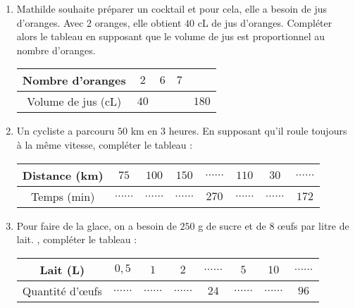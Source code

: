 \begin{pageAD} 




 \begin{enumerate}
 \item Mathilde souhaite préparer un cocktail et pour cela, elle a besoin de jus d'oranges.
 Avec 2 oranges, elle obtient $40$ cL de jus d'oranges. Compléter alors le tableau en supposant que le volume de jus est proportionnel au nombre d'oranges.
 \begin{center}
     \begin{tabular}{|c|c|c|c|c|}\hline
         Nombre d'oranges & $2$ & $6$ & $7$ &  \\
         \hline Volume de jus (cL) & $40$ &  & & $180$ \\\hline
     \end{tabular}
 \end{center}
 
 
 \item Un cycliste a parcouru $50$ km en 3 heures. En supposant qu’il roule toujours à la
 même vitesse, compléter le tableau :
 \begin{center}
     \begin{tabular}{|c|c|c|c|c|c|c|c|}\hline
         Distance (km) & $75$ & $100$ & $150$ &  $\ldots\ldots$  & $110$ & $30$ &  $\ldots\ldots$ \\\hline
          Temps (min) &  $\ldots\ldots$ &  $\ldots\ldots$  &  $\ldots\ldots$ & $270$ &  $\ldots\ldots$ &  $\ldots\ldots$& $172$ \\\hline
     \end{tabular}
 \end{center} 
 

 \item Pour faire de la glace, on a besoin de $250$ g de sucre et de $8$ œufs par litre de lait. , compléter le tableau :
 \begin{center}
     \begin{tabular}{|c|c|c|c|c|c|c|c|}\hline
         Lait (L) & $0,5$ & $1$ & $2$ &  $\ldots\ldots$ & $5$ & $10$ &  $\ldots\ldots$ \\\hline
          Quantité d'œufs &  $\ldots\ldots$ & $\ldots\ldots$   & $\ldots\ldots$ & $24$ & $\ldots\ldots$ & $\ldots\ldots$ &  $96$ \\\hline
     \end{tabular}
 \end{center} 
 
 \end{enumerate}


 

\end{pageAD} 
 
